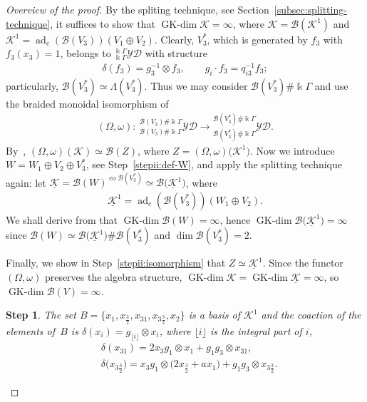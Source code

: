 \documentclass[10pt,a4paper]{amsart}
\numberwithin{equation}{section}
\newtheorem{stepii}{Step}
\newcommand{\adc}{\operatorname{ad}_c}
\newcommand{\co}{\operatorname{co}}
\newcommand{\GK}{\operatorname{GK-dim}}
\newcommand{\toba}{\mathscr B}
\newcommand{\K}{{\mathcal{K}}}
\newcommand{\Ku}{\underline{\mathcal K}}
\newcommand{\yd}[1]{{}_{#1}^{#1}\mathcal{YD}}
\newcommand{\tresdos}{\frac{3}{2}}
\begin{document}
\begin{proof}[Overview of the proof]
By the spliting technique, see Section~\ref{subsec:splitting-technique}, it suffices to
show that $\GK \K = \infty$, where $\K = \toba\left( \K^1 \right)$ and $\K^1 = \adc(\toba(V_3))(V_1 \oplus V_2)$.
Clearly, $V_3^*$, which is generated by $f_3$ with $f_3(x_3)=1$, belongs to $\yd{\Bbbk\Gamma}$ with structure
\begin{align*}
\delta(f_3)=g_3^{-1}\otimes f_3, \qquad g_i\cdot f_3=q_{i3}^{-1}f_3;
\end{align*}
particularly, $\toba(V_3^*) \simeq \Lambda (V_3^*)$.
Thus we may consider $\toba(V_3^*)\#\Bbbk \Gamma$ and use the braided monoidal isomorphism of~\cite[Remark~12.3.8]{HS-book}
\begin{align*}
(\Omega,\omega)\colon\ \yd{\toba(V_3)\#\Bbbk \Gamma}\to \yd{\toba(V_3^*)\#\Bbbk \Gamma}.
\end{align*}
By~\cite[Corollary~12.3.9]{HS-book}, $(\Omega,\omega)(\K)\simeq \toba(Z)$, where $Z=(\Omega,\omega)\big(\K^1\big)$.
Now we introduce $W=W_1\oplus V_2\oplus V_3^*$, see Step~\ref{stepii:def-W}, and apply the splitting technique again:
let $\Ku = \toba\left(W\right)^{\co \toba(V_3^*)} \simeq \toba \big(\Ku^1\big)$, where
\begin{align*}
\Ku^1=\adc(\toba(V_3^*))(W_1 \oplus V_2).
\end{align*}
We shall derive from \cite[Lemma 5.4.11]{AAH-triang} that $\GK\toba(W)=\infty$, hence $\GK \toba\big(\Ku^1\big)=\infty$ since
$\toba(W) \simeq \toba\big(\Ku^1\big) \# \toba(V_3^*)$ and $\dim \toba(V_3^*)=2$.

Finally, we show in Step~\ref{stepii:isomorphism} that $Z\simeq \Ku^1$.
Since the functor $(\Omega,\omega)$ preserves the algebra structure,
$\GK \K=\GK\Ku=\infty$, so $\GK\toba(V)=\infty$.

\begin{stepii}\label{stepii:base1}
The set $B=\big\{x_1,x_{\tresdos},x_{31},x_{3\tresdos},x_2\big\}$ is a basis of $\K^1$
and the coaction of the elements of~$B$ is $\delta(x_i) = g_{\lfloor i\rfloor}\otimes x_i$,
where $\lfloor i\rfloor$ is the integral part of $i$,
\begin{align*}
&\delta(x_{31}) = 2x_3g_1 \otimes x_1 + g_1g_3 \otimes x_{31},
\\
&\delta\big(x_{3\tresdos}\big) = x_3g_1 \otimes \big(2x_{\tresdos}+ax_1\big) + g_1g_3 \otimes x_{3\tresdos}.
\end{align*}
\end{stepii}


\end{proof}
\end{document}
